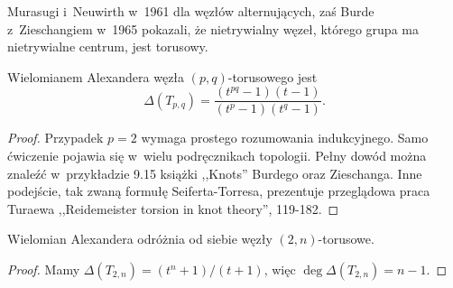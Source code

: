 Murasugi i~Neuwirth w~1961 dla węzłów alternujących,
zaś Burde z~Zieschangiem w~1965 pokazali, że nietrywialny węzeł,
którego grupa ma nietrywialne centrum, jest torusowy.

\begin{proposition}
    Wielomianem Alexandera węzła $(p,q)$-torusowego jest
    \[
         \Delta(T_{p,q}) = \frac{(t^{pq}-1)(t-1)}{(t^p-1)(t^q-1)}.
    \]
\end{proposition}

\begin{proof}
    Przypadek $p = 2$ wymaga prostego rozumowania indukcyjnego.
    Samo ćwiczenie pojawia się w~wielu podręcznikach topologii.
    Pełny dowód można znaleźć w~przykładzie 9.15 książki ,,Knots'' Burdego oraz Zieschanga.
    Inne podejście, tak zwaną formułę Seiferta-Torresa, prezentuje przeglądowa praca Turaewa ,,Reidemeister torsion in knot theory'', 119-182.
\end{proof}

\begin{corollary}
    Wielomian Alexandera odróżnia od siebie węzły $(2,n)$-torusowe.
\end{corollary}

\begin{proof}
    Mamy $\Delta(T_{2,n}) = (t^n+1) / (t+1)$, więc $\deg \Delta (T_{2,n}) = n - 1$.
\end{proof}

